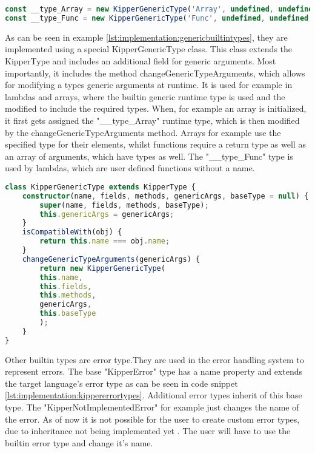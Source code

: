 \begin{lstlisting}[language=Typescript,caption=Generic builtin types,label=lst:implementation:genericbuiltintypes]
const __type_Array = new KipperGenericType('Array', undefined, undefined, {T: __type_any});
const __type_Func = new KipperGenericType('Func', undefined, undefined, {T: [], R: __type_any});	
\end{lstlisting}

As can be seen in example \ref{lst:implementation:genericbuiltintypes}, they are implemented using a special KipperGenericType class. This class extends the KipperType and includes an additional field for generic arguments. Most importantly, it includes the method changeGenericTypeArguments, which allows for modifying a types generic arguments at runtime. It is used for example in lambdas and arrays, where the builtin generic runtime type is used and the modified to include the required types. When, for example an array is initialized, it first gets assigned the "\_\_type\_Array" runtime type, which is then modified by the changeGenericTypeArguments method. Arrays for example use the specified type for their elements, whilst functions require a return type as well as an array of arguments, which have types as well. The "\_\_type\_Func" type is used by lambdas, which are user defined functions without a name.

\begin{lstlisting}[language=Typescript,caption=Generic Kipper Type,label=lst:implementation:generickippertype]
class KipperGenericType extends KipperType {
	constructor(name, fields, methods, genericArgs, baseType = null) {
		super(name, fields, methods, baseType);
		this.genericArgs = genericArgs;
	}
	isCompatibleWith(obj) {
		return this.name === obj.name;
	}
	changeGenericTypeArguments(genericArgs) {
		return new KipperGenericType(
		this.name,
		this.fields,
		this.methods,
		genericArgs,
		this.baseType
		);
	}
}
\end{lstlisting}

Other builtin types are error type.They are used in the error handling system to represent errors. The base "KipperError" type has a name property and extends the target language's error type as can be seen in code snippet \ref{lst:implementation:kippererrortypes}. Additional error types inherit of this base type. The "KipperNotImplementedError" for example just changes the name of the error. As of now it is not possible for the user to create custom error types, due to inheritance not being implemented yet . The user will have to use the builtin error type and change it's name. 

